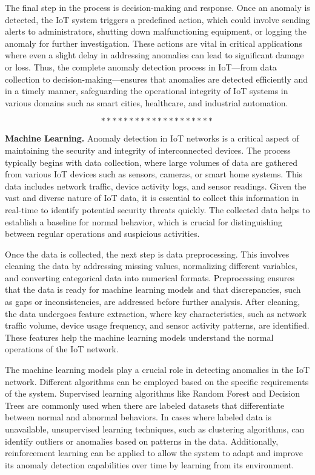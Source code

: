 The final step in the process is decision-making and response. Once an anomaly is detected, the IoT system triggers a predefined action, which could involve sending alerts to administrators, shutting down malfunctioning equipment, or logging the anomaly for further investigation. These actions are vital in critical applications where even a slight delay in addressing anomalies can lead to significant damage or loss. Thus, the complete anomaly detection process in IoT—from data collection to decision-making—ensures that anomalies are detected efficiently and in a timely manner, safeguarding the operational integrity of IoT systems in various domains such as smart cities, healthcare, and industrial automation\cite{83}.

$$********************$$

\textbf{Machine Learning.} Anomaly detection in IoT networks is a critical aspect of maintaining the security and integrity of interconnected devices. The process typically begins with data collection, where large volumes of data are gathered from various IoT devices such as sensors, cameras, or smart home systems. This data includes network traffic, device activity logs, and sensor readings. Given the vast and diverse nature of IoT data, it is essential to collect this information in real-time to identify potential security threats quickly. The collected data helps to establish a baseline for normal behavior, which is crucial for distinguishing between regular operations and suspicious activities.

Once the data is collected, the next step is data preprocessing. This involves cleaning the data by addressing missing values, normalizing different variables, and converting categorical data into numerical formats. Preprocessing ensures that the data is ready for machine learning models and that discrepancies, such as gaps or inconsistencies, are addressed before further analysis. After cleaning, the data undergoes feature extraction, where key characteristics, such as network traffic volume, device usage frequency, and sensor activity patterns, are identified. These features help the machine learning models understand the normal operations of the IoT network.

The machine learning models play a crucial role in detecting anomalies in the IoT network. Different algorithms can be employed based on the specific requirements of the system. Supervised learning algorithms like Random Forest and Decision Trees are commonly used when there are labeled datasets that differentiate between normal and abnormal behaviors. In cases where labeled data is unavailable, unsupervised learning techniques, such as clustering algorithms, can identify outliers or anomalies based on patterns in the data. Additionally, reinforcement learning can be applied to allow the system to adapt and improve its anomaly detection capabilities over time by learning from its environment.

